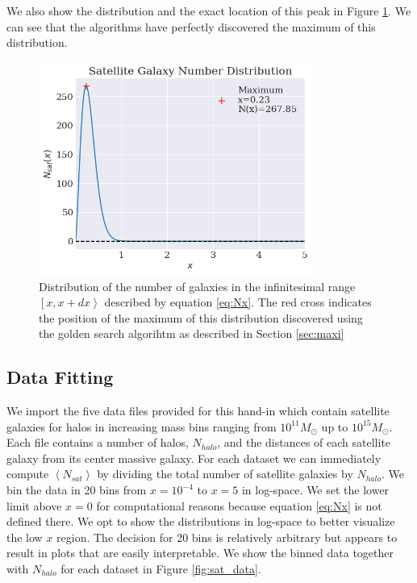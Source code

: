 

We also show the distribution and the exact location of this peak in Figure \ref{fig:maximum}. We can see that the algorithms have perfectly discovered the maximum of this distribution.

\begin{figure}
    \centering
    \includegraphics[width=0.8\textwidth]{results/maxi.png}
    \caption{Distribution of the number of galaxies in the infinitesimal range $\left[x, x+dx\right>$ described by equation \ref{eq:Nx}. The red cross indicates the position of the maximum of this distribution discovered using the golden search algorihtm as described in Section \ref{sec:maxi}}
    \label{fig:maximum}
\end{figure}




\subsection{Data Fitting}\label{sec:datafitting}

We import the five data files provided for this hand-in which contain satellite galaxies for halos in increasing mass bins ranging from $10^{11} M_{\odot}$ up to $10^{15} M_{\odot}$. Each file contains a number of halos, $N_{halo}$, and the distances of each satellite galaxy from its center massive galaxy. For each dataset we can immediately compute $\left<N_{sat}\right>$ by dividing the total number of satellite galaxies by $N_{halo}$. We bin the data in 20 bins from $x = 10^{-4}$ to $x=5$ in log-space. We set the lower limit above $x=0$ for computational reasons because equation \ref{eq:Nx} is not defined there. We opt to show the distributions in log-space to better visualize the low $x$ region. The decision for 20 bins is relatively arbitrary but appears to result in plots that are easily interpretable. We show the binned data together with $N_{halo}$ for each dataset in Figure \ref{fig:sat_data}.

